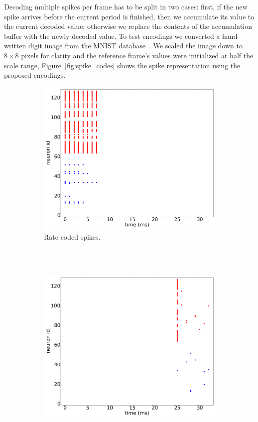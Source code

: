 \documentclass[conference]{IEEEtran}
\begin{document}
Decoding multiple spikes per frame has to be split in two cases: first, if the new spike arrives before the current period is finished, then we accumulate its value to the current decoded value; otherwise we replace the contents of the accumulation buffer with the newly decoded value. To test encodings we converted a hand-written digit image from the MNIST database~\cite{mnist,mnist:web}. We scaled the image down to $8\times8$ pixels for clarity and the reference frame's values were initialized at half the scale range, Figure~\ref{fig:spike_codes} shows the spike representation using the proposed encodings.

\begin{figure}[hbt]
  \captionsetup[subfigure]{justification=centering}
  
  \centering
  \begin{subfigure}[b]{0.32\textwidth}
    \includegraphics[width=\textwidth]{rate_coded_-8x8-_cycle_0}
    \caption{Rate coded spikes.\\~ }
    \label{fig:rate_spikes}
  \end{subfigure}~
  \begin{subfigure}[b]{0.32\textwidth}
    \includegraphics[width=\textwidth]{time_coded_-8x8-_cycle_0}

\end{subfigure}
\end{figure}
\end{document}
